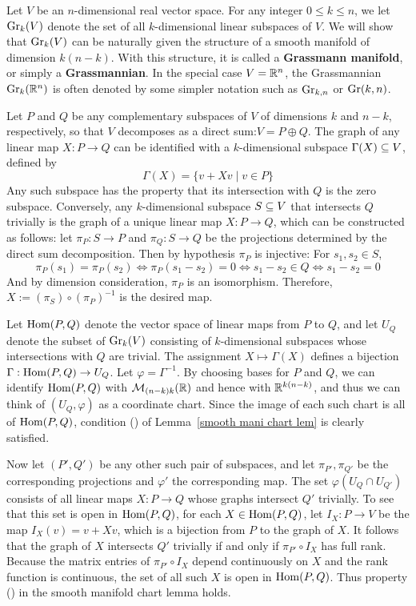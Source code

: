 \begin{example}
Let $V$ be an $n$-dimensional real vector space. For any integer $0\leq k\leq n$, we let $\mathrm{Gr}_k(V)$ denote the set of all $k$-dimensional linear subspaces of $V$. We will show that $\mathrm{Gr}_k(V)$ can be naturally given the structure of a smooth manifold of dimension $k(n-k)$. With this structure, it is called a \textbf{Grassmann manifold}, or simply a \textbf{Grassmannian}. In the special case $V=\mathbb{R}^n$, the Grassmannian $\mathrm{Gr}_k(\mathbb{R}^n)$ is often denoted by some simpler notation such as $\mathrm{Gr}_{k,n}$ or $\mathrm{Gr}(k,n)$.\par
Let $P$ and $Q$ be any complementary subspaces of $V$ of dimensions $k$ and $n-k$, respectively, so that $V$ decomposes as a direct sum:$V=P\oplus Q$. The graph of any linear map $X:P\to Q$ can be identified with a $k$-dimensional subspace $\Gamma(X)\subseteq V$, defined by
\[\Gamma(X)=\{v+Xv\mid v\in P\}\]
Any such subspace has the property that its intersection with $Q$ is the zero subspace. Conversely, any $k$-dimensional subspace $S\subseteq V$ that intersects $Q$ trivially is the graph of a unique linear map $X:P\to Q$, which can be constructed as follows: let $\pi_P:S\to P$ and $\pi_Q:S\to Q$ be the projections determined by the direct sum decomposition. Then by hypothesis $\pi_P$ is injective: For $s_1,s_2\in S$,
\[\pi_P(s_1)=\pi_P(s_2)\iff\pi_P(s_1-s_2)=0\iff s_1-s_2\in Q\iff s_1-s_2=0\]
And by dimension consideration, $\pi_P$ is an isomorphism. Therefore, $X:=(\pi_S)\circ(\pi_P)^{-1}$ is the desired map.\par
Let $\mathrm{Hom}(P,Q)$ denote the vector space of linear maps from $P$ to $Q$, and let $U_Q$ denote the subset of $\mathrm{Gr}_k(V)$ consisting of $k$-dimensional subspaces whose intersections with $Q$ are trivial. The assignment $X\mapsto\Gamma(X)$ defines a bijection $\Gamma:\mathrm{Hom}(P,Q)\to U_Q$. Let $\varphi=\Gamma^{-1}$. By choosing bases for $P$ and $Q$, we can identify $\mathrm{Hom}(P,Q)$ with $\mathcal{M}_{(n-k)k}(\mathbb{R})$ and hence with $\mathbb{R}^{k(n-k)}$, and thus we can think of $(U_Q,\varphi)$ as a coordinate chart. Since the image of each such chart is all of $\mathrm{Hom}(P,Q)$, condition () of Lemma~\ref{smooth mani chart lem} is clearly satisfied.\par
Now let $(P',Q')$ be any other such pair of subspaces, and let $\pi_{P'},\pi_{Q'}$ be the corresponding projections and $\varphi'$ the corresponding map. The set $\varphi(U_Q\cap U_{Q'})$ consists of all linear maps $X:P\to Q$ whose graphs intersect $Q'$ trivially. To see that this set is open in $\mathrm{Hom}(P,Q)$, for each $X\in\mathrm{Hom}(P,Q)$, let $I_X:P\to V$ be the map $I_X(v)=v+Xv$, which is a bijection from $P$ to the graph of $X$. It follows that the graph of $X$ intersects $Q'$ trivially if and only if $\pi_{P'}\circ I_X$ has full rank. Because the matrix entries of $\pi_{P'}\circ I_X$ depend continuously on $X$ and the rank function is continuous, the set of all such $X$ is open in $\mathrm{Hom}(P,Q)$. Thus property () in the smooth manifold chart lemma holds.\par

\end{example}
